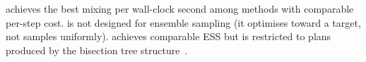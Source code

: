 \ms{} achieves the best mixing per wall-clock second among methods with
comparable per-step cost.
\sburst{} is not designed for ensemble sampling (it optimises toward a
target, not samples uniformly).
\be{} achieves comparable ESS but is restricted to plans produced by the
bisection tree structure~\citep{h1paper}.
